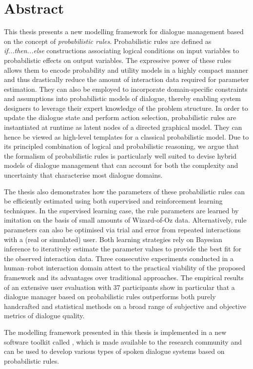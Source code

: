 \chapter*{Abstract}

This thesis presents a new modelling framework for dialogue management based on the concept of \textit{probabilistic rules}.  Probabilistic rules are defined as \textit{if...then...else} constructions associating logical conditions on input variables to probabilistic effects on output variables. The expressive power of these rules allows them to encode probability and utility models in a highly compact manner and thus drastically reduce the amount of interaction data required for parameter estimation. They can also be employed to incorporate domain-specific constraints and assumptions into probabilistic models of dialogue, thereby enabling system designers to leverage their expert knowledge of the problem structure.  In order to update the dialogue state and perform action selection, probabilistic rules are instantiated at runtime as latent nodes of a directed graphical model.  They can hence be viewed as high-level templates for a classical probabilistic model. Due to its principled combination of logical and probabilistic reasoning, we argue that the formalism of probabilistic rules is particularly well suited to devise hybrid models of dialogue management that can account for both the complexity and uncertainty that characterise most dialogue domains.

The thesis also demonstrates how the parameters of these probabilistic rules can be efficiently estimated using both supervised and reinforcement learning techniques. In the supervised learning case, the rule parameters are learned by imitation on the basis of small amounts of Wizard-of-Oz data.  Alternatively, rule parameters can also be optimised via trial and error from repeated interactions with a (real or simulated) user. Both learning strategies rely on Bayesian inference to iteratively estimate the parameter values to provide the best fit for the observed interaction data. Three consecutive experiments conducted in a human--robot interaction domain attest to the practical viability of the proposed framework and its advantages over traditional approaches.  The empirical results of an extensive user evaluation with 37 participants show in particular that a dialogue manager based on probabilistic rules outperforms both purely handcrafted and statistical methods on a broad range of subjective and objective metrics of dialogue quality.

The modelling framework presented in this thesis is implemented in a new software toolkit called \opendial{}, which is made available to the research community and can be used to develop various types of spoken dialogue systems based on probabilistic rules. 
